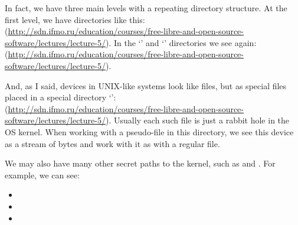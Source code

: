 In fact, we have three main levels with a repeating directory structure.
At the first level, we have directories like this:\\
(\url{http://sdn.ifmo.ru/education/courses/free-libre-and-open-source-software/lectures/lecture-5/}).
In the `' and `' directories we see again:\\
(\url{http://sdn.ifmo.ru/education/courses/free-libre-and-open-source-software/lectures/lecture-5/}).

And, as I said, devices in UNIX-like systems look like files,
but as special files placed in a special directory `':\\
(\url{http://sdn.ifmo.ru/education/courses/free-libre-and-open-source-software/lectures/lecture-5/}).
Usually each such file is just a rabbit hole in the OS kernel.
When working with a pseudo-file in this directory, we see this device
as a stream of bytes and work with it as with a regular file.

We may also have many other secret paths to the kernel, such as 
and . For example, we can see:
\begin{itemize}
\item {}
\item {}
\item {}
\end{itemize}
